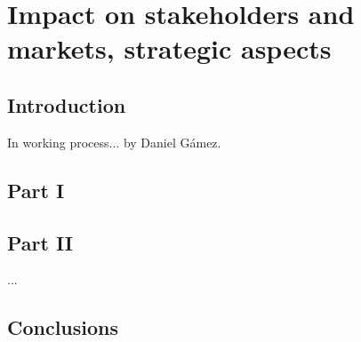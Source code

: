\chapter{Impact on stakeholders and markets, strategic aspects}

\section{Introduction}
In working process... by Daniel G\'amez.\\
\section{Part I}\label{Part I}  %


\section{Part II}\label{Part II} %

...

\section{Conclusions}\label{conclusions}